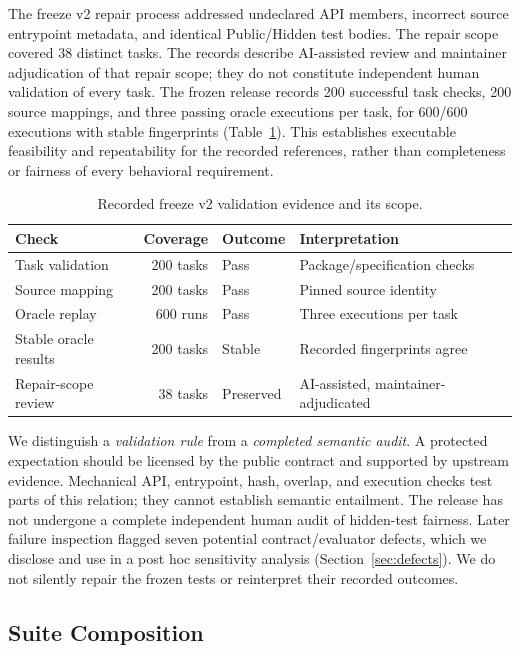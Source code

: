 \documentclass[acmsmall,screen,review,anonymous]{acmart}
\begin{document}
The freeze v2 repair process addressed undeclared API members, incorrect source
entrypoint metadata, and identical Public/Hidden test bodies. The repair scope
covered 38 distinct tasks. The records describe AI-assisted review and maintainer
adjudication of that repair scope; they do not constitute independent human
validation of every task. The frozen release records 200 successful task checks,
200 source mappings, and three passing oracle executions per task, for 600/600
executions with stable fingerprints (Table~\ref{tab:validation}). This establishes
executable feasibility and repeatability for the recorded references, rather
than completeness or fairness of every behavioral requirement.

\begin{table}[t]
 \caption{Recorded freeze v2 validation evidence and its scope.}
 \label{tab:validation}
 \centering\small
 \begin{tabularx}{\linewidth}{@{}lrlX@{}}
 \toprule
 Check & Coverage & Outcome & Interpretation \\
 \midrule
 Task validation & 200 tasks & Pass & Package/specification checks \\
 Source mapping & 200 tasks & Pass & Pinned source identity \\
 Oracle replay & 600 runs & Pass & Three executions per task \\
 Stable oracle results & 200 tasks & Stable & Recorded fingerprints agree \\
 Repair-scope review & 38 tasks & Preserved & AI-assisted, maintainer-adjudicated \\
 \bottomrule
 \end{tabularx}
\end{table}

We distinguish a \emph{validation rule} from a \emph{completed semantic audit}.
A protected expectation should be licensed by the public contract and supported
by upstream evidence. Mechanical API, entrypoint, hash, overlap, and execution
checks test parts of this relation; they cannot establish semantic entailment.
The release has not undergone a complete independent human audit of hidden-test
fairness. Later failure inspection flagged seven potential contract/evaluator
defects, which we disclose and use in a post hoc sensitivity analysis
(Section~\ref{sec:defects}). We do not silently repair the frozen tests or
reinterpret their recorded outcomes.

\subsection{Suite Composition}
\label{sec:suite}
\end{document}
